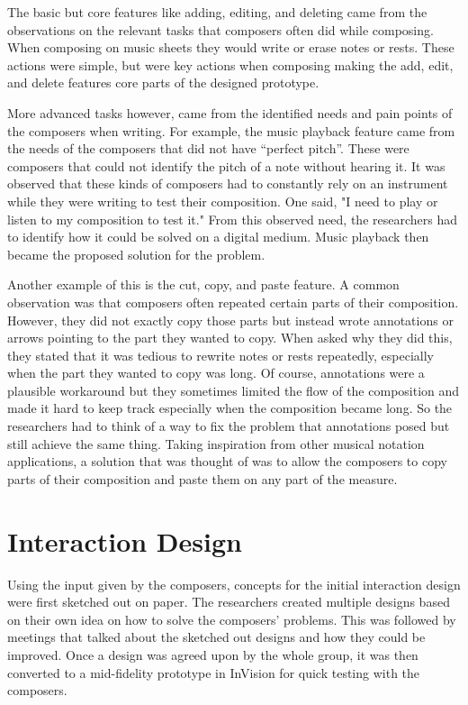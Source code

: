           	The basic but core features like adding, editing, and deleting came from the observations on the relevant tasks that composers often did while composing. When composing on music sheets they would write or erase notes or rests. These actions were simple, but were key actions when composing making the add, edit, and delete features core parts of the designed prototype. 

          	More advanced tasks however, came from the identified needs and pain points of the composers when writing. For example, the music playback feature came from the needs of the composers that did not have ``perfect pitch''. These were composers that could not identify the pitch of a note without hearing it. It was observed that these kinds of composers had to constantly rely on an instrument while they were writing to test their composition. One said, "I need to play or listen to my composition to test it." From this observed need, the researchers had to identify how it could be solved on a digital medium. Music playback then became the proposed solution for the problem. 

          	Another example of this is the cut, copy, and paste feature. A common observation was that composers often repeated certain parts of their composition. However, they did not exactly copy those parts but instead wrote annotations or arrows pointing to the part they wanted to copy. When asked why they did this, they stated that it was tedious to rewrite notes or rests repeatedly, especially when the part they wanted to copy was long. Of course, annotations were a plausible workaround but they sometimes limited the flow of the composition and made it hard to keep track especially when the composition became long. So the researchers had to think of a way to fix the problem that annotations posed but still achieve the same thing. Taking inspiration from other musical notation applications, a solution that was thought of was to allow the composers to copy parts of their composition and paste them on any part of the measure. 

	\section{Interaction Design}

		Using the input given by the composers, concepts for the initial interaction design were first sketched out on paper. The researchers created multiple designs based on their own idea on how to solve the composers' problems. This was followed by meetings that talked about the sketched out designs and how they could be improved. Once a design was agreed upon by the whole group, it was then converted to a mid-fidelity prototype in InVision for quick testing with the composers. 


